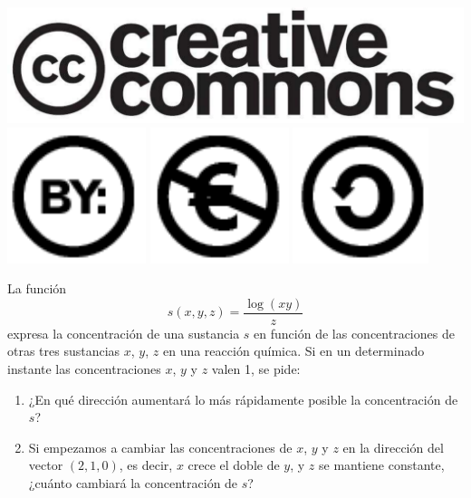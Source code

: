 \documentclass[aspectratio=149,10pt,xcolor=dvipsnames,t]{beamer}
\begin{document}
\begin{frame}[c]
\begin{center}
\biskip
\includegraphics[scale=0.07]{img/cc-logo}
\includegraphics[scale=0.2]{img/cc-by}
\includegraphics[scale=0.2]{img/cc-e}
\includegraphics[scale=0.2]{img/cc-c}
\end{center}
\end{frame}

\begin{frame}[c]
 La función 
\[s(x,y,z)=\dfrac{\log(xy)}{z}\]
expresa la concentración de una sustancia $s$ en función de
las concentraciones de otras tres sustancias $x$, $y$, $z$ en una reacción química. Si en un determinado
instante las concentraciones $x$, $y$ y $z$ valen 1, se pide:
\begin{enumerate}
\item ¿En qué dirección aumentará lo más rápidamente posible la concentración de $s$?
\item Si empezamos a cambiar las concentraciones de $x$, $y$ y $z$ en la dirección del vector
$(2,1,0)$, es decir, $x$ crece el doble de $y$, y $z$ se mantiene constante, ¿cuánto cambiará la concentración de $s$?
\end{enumerate}
\end{frame}
\end{document}
